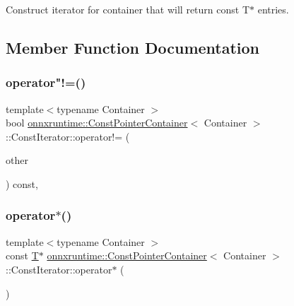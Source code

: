 Construct iterator for container that will return const T$\ast$ entries. 

\subsection{Member Function Documentation}
\mbox{\label{classonnxruntime_1_1ConstPointerContainer_1_1ConstIterator_a4ade631f17f370b56698548c32ed6ff1}} 
\subsubsection{\texorpdfstring{operator"!=()}{operator!=()}}
{\footnotesize\ttfamily template$<$typename Container $>$ \\
bool \mbox{\hyperlink{classonnxruntime_1_1ConstPointerContainer}{onnxruntime\+::\+Const\+Pointer\+Container}}$<$ Container $>$\+::Const\+Iterator\+::operator!= (\begin{DoxyParamCaption}\item[{const \mbox{\hyperlink{classonnxruntime_1_1ConstPointerContainer_1_1ConstIterator}{Const\+Iterator}} \&}]{other }\end{DoxyParamCaption}) const\hspace{0.3cm}{\ttfamily [inline]}, {\ttfamily [noexcept]}}

\mbox{\label{classonnxruntime_1_1ConstPointerContainer_1_1ConstIterator_aa3c479fb00b11f22de339109fd5f0bec}} 
\subsubsection{\texorpdfstring{operator$\ast$()}{operator*()}}
{\footnotesize\ttfamily template$<$typename Container $>$ \\
const \mbox{\hyperlink{classonnxruntime_1_1ConstPointerContainer_ae78936c3220735b7dba8004b7d5c9888}{T}}$\ast$ \mbox{\hyperlink{classonnxruntime_1_1ConstPointerContainer}{onnxruntime\+::\+Const\+Pointer\+Container}}$<$ Container $>$\+::Const\+Iterator\+::operator$\ast$ (\begin{DoxyParamCaption}{ }\end{DoxyParamCaption})\hspace{0.3cm}{\ttfamily [inline]}}

